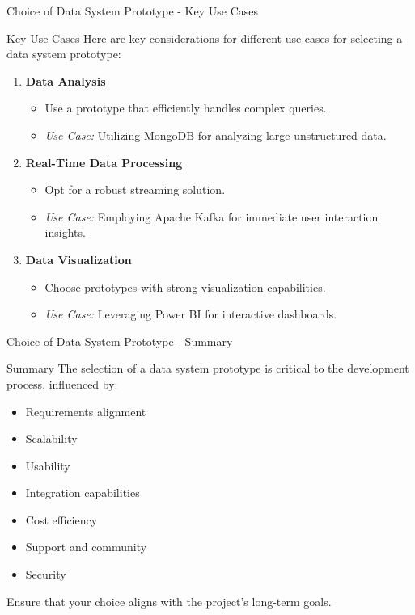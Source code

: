 \documentclass[aspectratio=169]{beamer}
\begin{document}
\begin{frame}[fragile]{Choice of Data System Prototype - Key Use Cases}
  \begin{block}{Key Use Cases}
    Here are key considerations for different use cases for selecting a data system prototype:
  \end{block}
  \begin{enumerate}
    \item \textbf{Data Analysis}
    \begin{itemize}
      \item Use a prototype that efficiently handles complex queries.
      \item \textit{Use Case:} Utilizing MongoDB for analyzing large unstructured data.
    \end{itemize}

    \item \textbf{Real-Time Data Processing}
    \begin{itemize}
      \item Opt for a robust streaming solution.
      \item \textit{Use Case:} Employing Apache Kafka for immediate user interaction insights.
    \end{itemize}

    \item \textbf{Data Visualization}
    \begin{itemize}
      \item Choose prototypes with strong visualization capabilities.
      \item \textit{Use Case:} Leveraging Power BI for interactive dashboards.
    \end{itemize}
  \end{enumerate}
\end{frame}

\begin{frame}[fragile]{Choice of Data System Prototype - Summary}
  \begin{block}{Summary}
    The selection of a data system prototype is critical to the development process, influenced by:
    \begin{itemize}
      \item Requirements alignment
      \item Scalability
      \item Usability
      \item Integration capabilities
      \item Cost efficiency
      \item Support and community
      \item Security
    \end{itemize}
    Ensure that your choice aligns with the project's long-term goals.
  \end{block}
\end{frame}
\end{document}
